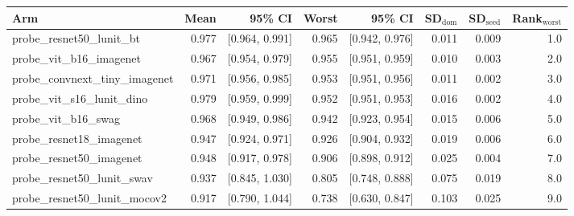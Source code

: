 \begin{tabular}{lrrrrrrr}
\toprule
Arm & Mean & 95\% CI & Worst & 95\% CI & SD$_\text{dom}$ & SD$_\text{seed}$ & Rank$_\text{worst}$ \\
\midrule
probe\_resnet50\_lunit\_bt & 0.977 & [0.964, 0.991] & 0.965 & [0.942, 0.976] & 0.011 & 0.009 & 1.0 \\
probe\_vit\_b16\_imagenet & 0.967 & [0.954, 0.979] & 0.955 & [0.951, 0.959] & 0.010 & 0.003 & 2.0 \\
probe\_convnext\_tiny\_imagenet & 0.971 & [0.956, 0.985] & 0.953 & [0.951, 0.956] & 0.011 & 0.002 & 3.0 \\
probe\_vit\_s16\_lunit\_dino & 0.979 & [0.959, 0.999] & 0.952 & [0.951, 0.953] & 0.016 & 0.002 & 4.0 \\
probe\_vit\_b16\_swag & 0.968 & [0.949, 0.986] & 0.942 & [0.923, 0.954] & 0.015 & 0.006 & 5.0 \\
probe\_resnet18\_imagenet & 0.947 & [0.924, 0.971] & 0.926 & [0.904, 0.932] & 0.019 & 0.006 & 6.0 \\
probe\_resnet50\_imagenet & 0.948 & [0.917, 0.978] & 0.906 & [0.898, 0.912] & 0.025 & 0.004 & 7.0 \\
probe\_resnet50\_lunit\_swav & 0.937 & [0.845, 1.030] & 0.805 & [0.748, 0.888] & 0.075 & 0.019 & 8.0 \\
probe\_resnet50\_lunit\_mocov2 & 0.917 & [0.790, 1.044] & 0.738 & [0.630, 0.847] & 0.103 & 0.025 & 9.0 \\
\bottomrule
\end{tabular}

